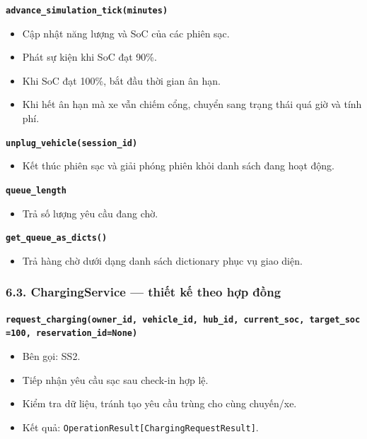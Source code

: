\documentclass[11pt,a4paper]{article}
\providecommand{\tightlist}{%
  \setlength{\itemsep}{0pt}\setlength{\parskip}{0pt}}
\begin{document}
\textbf{\texttt{advance\_simulation\_tick(minutes)}}

\begin{itemize}
\tightlist
\item
  Cập nhật năng lượng và SoC của các phiên sạc.
\item
  Phát sự kiện khi SoC đạt 90\%.
\item
  Khi SoC đạt 100\%, bắt đầu thời gian ân hạn.
\item
  Khi hết ân hạn mà xe vẫn chiếm cổng, chuyển sang trạng thái quá giờ và
  tính phí.
\end{itemize}

\textbf{\texttt{unplug\_vehicle(session\_id)}}

\begin{itemize}
\tightlist
\item
  Kết thúc phiên sạc và giải phóng phiên khỏi danh sách đang hoạt động.
\end{itemize}

\textbf{\texttt{queue\_length}}

\begin{itemize}
\tightlist
\item
  Trả số lượng yêu cầu đang chờ.
\end{itemize}

\textbf{\texttt{get\_queue\_as\_dicts()}}

\begin{itemize}
\tightlist
\item
  Trả hàng chờ dưới dạng danh sách dictionary phục vụ giao diện.
\end{itemize}

\hypertarget{chargingservice-thiux1ebft-kux1ebf-theo-hux1ee3p-ux111ux1ed3ng}{%
\subsubsection{6.3. ChargingService --- thiết kế theo hợp
đồng}\label{chargingservice-thiux1ebft-kux1ebf-theo-hux1ee3p-ux111ux1ed3ng}}

\textbf{\texttt{request\_charging(owner\_id,\ vehicle\_id,\ hub\_id,\ current\_soc,\ target\_soc=100,\ reservation\_id=None)}}

\begin{itemize}
\tightlist
\item
  Bên gọi: SS2.
\item
  Tiếp nhận yêu cầu sạc sau check-in hợp lệ.
\item
  Kiểm tra dữ liệu, tránh tạo yêu cầu trùng cho cùng chuyến/xe.
\item
  Kết quả: \texttt{OperationResult{[}ChargingRequestResult{]}}.
\end{itemize}
\end{document}
